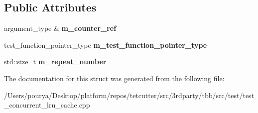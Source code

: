 \subsection*{Public Attributes}
\begin{DoxyCompactItemize}
\item 
\hypertarget{structhelpers_1_1native__for__concurrent__op__repeated_adbfcfe690955c1eec32ffc691dea892f}{}argument\+\_\+type \& {\bfseries m\+\_\+counter\+\_\+ref}\label{structhelpers_1_1native__for__concurrent__op__repeated_adbfcfe690955c1eec32ffc691dea892f}

\item 
\hypertarget{structhelpers_1_1native__for__concurrent__op__repeated_abdd80ed9dbd1cd3a9f45d1b7d746b45b}{}test\+\_\+function\+\_\+pointer\+\_\+type {\bfseries m\+\_\+test\+\_\+function\+\_\+pointer\+\_\+type}\label{structhelpers_1_1native__for__concurrent__op__repeated_abdd80ed9dbd1cd3a9f45d1b7d746b45b}

\item 
\hypertarget{structhelpers_1_1native__for__concurrent__op__repeated_a440b97690cae8979298468e09c93df23}{}std\+::size\+\_\+t {\bfseries m\+\_\+repeat\+\_\+number}\label{structhelpers_1_1native__for__concurrent__op__repeated_a440b97690cae8979298468e09c93df23}

\end{DoxyCompactItemize}


The documentation for this struct was generated from the following file\+:\begin{DoxyCompactItemize}
\item 
/\+Users/pourya/\+Desktop/platform/repos/tetcutter/src/3rdparty/tbb/src/test/test\+\_\+concurrent\+\_\+lru\+\_\+cache.\+cpp\end{DoxyCompactItemize}
